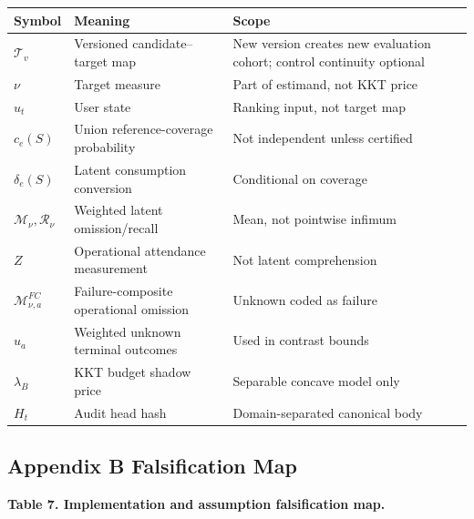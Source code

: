 \documentclass[
  11pt]{article}
\begin{document}
\begin{longtable}[]{@{}
  >{\raggedright\arraybackslash}p{}
  >{\raggedright\arraybackslash}p{}
  >{\raggedright\arraybackslash}p{}@{}}
\toprule\noalign{}
\begin{minipage}[b]{\linewidth}\raggedright
Symbol
\end{minipage} & \begin{minipage}[b]{\linewidth}\raggedright
Meaning
\end{minipage} & \begin{minipage}[b]{\linewidth}\raggedright
Scope
\end{minipage} \\
\midrule\noalign{}
\endhead
\bottomrule\noalign{}
\endlastfoot
\(\mathcal T_v\) & Versioned candidate--target map & New version creates
new evaluation cohort; control continuity optional \\
\(\nu\) & Target measure & Part of estimand, not KKT price \\
\(u_t\) & User state & Ranking input, not target map \\
\(c_e(S)\) & Union reference-coverage probability & Not independent
unless certified \\
\(\delta_e(S)\) & Latent consumption conversion & Conditional on
coverage \\
\(\mathcal M_\nu,\mathcal R_\nu\) & Weighted latent omission/recall &
Mean, not pointwise infimum \\
\(Z\) & Operational attendance measurement & Not latent comprehension \\
\(\mathcal M^{FC}_{\nu,a}\) & Failure-composite operational omission &
Unknown coded as failure \\
\(u_a\) & Weighted unknown terminal outcomes & Used in contrast
bounds \\
\(\lambda_B\) & KKT budget shadow price & Separable concave model
only \\
\(H_t\) & Audit head hash & Domain-separated canonical body \\
\end{longtable}

\subsection{Appendix B Falsification
Map}\label{appendix-b-falsification-map}

\textbf{Table 7. Implementation and assumption falsification map.}
\end{document}
